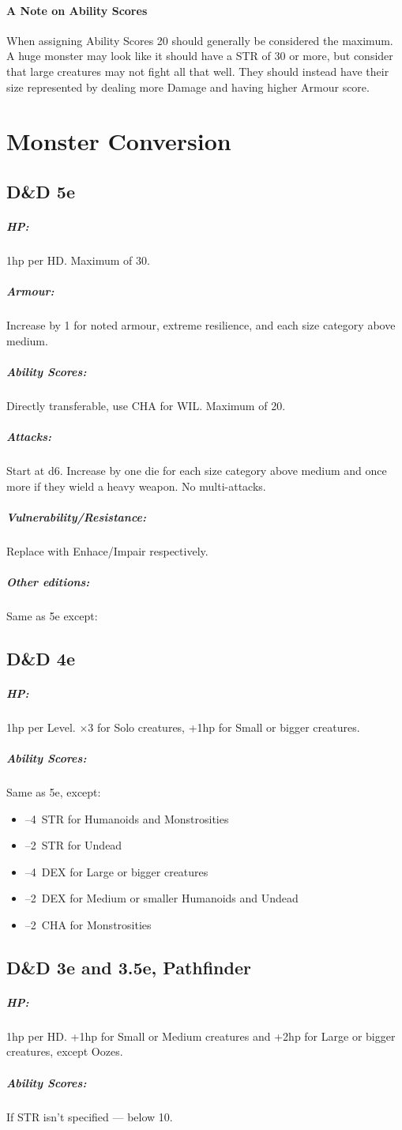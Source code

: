 \documentclass[itdr]{subfiles}
\begin{document}
\paragraph{A Note on Ability Scores}
When assigning Ability Scores 20 should generally be considered the maximum. A huge monster may look like it should have a STR of 30 or more, but consider that large creatures may not fight all that well. They should instead have their size represented by dealing more Damage and having higher Armour score.

\vfill
\break

\section{Monster Conversion}

\subsection*{D\&D 5e}

\subparagraph{HP:} 1hp per HD. Maximum of 30.
\subparagraph{Armour:} Increase by 1 for noted armour, extreme resilience, and each size category above medium.
\subparagraph{Ability Scores:} Directly transferable, use CHA for WIL. Maximum of 20.
\subparagraph{Attacks:} Start at d6. Increase by one die for each size category above medium and once more if they wield a heavy weapon. No multi-attacks.
\subparagraph{Vulnerability/Resistance:} Replace with Enhace/Impair respectively.

\subparagraph{Other editions:} Same as 5e except:
\subsection*{D\&D 4e}
\subparagraph{HP:} 1hp per Level. $\times$3 for Solo creatures, +1hp for Small or bigger creatures.
\subparagraph{Ability Scores:} Same as 5e, except:
\begin{itemize}
	\item --4~STR for Humanoids and Monstrosities
	\item --2~STR for Undead
	\item --4~DEX for Large or bigger creatures
	\item --2~DEX for Medium or smaller Humanoids and Undead
	\item --2~CHA for Monstrosities
\end{itemize}

\subsection*{D\&D 3e and 3.5e, Pathfinder}
\subparagraph{HP:} 1hp per HD. +1hp for Small or Medium creatures and +2hp for Large or bigger creatures, except Oozes.
\subparagraph{Ability Scores:} If STR isn't specified --- below 10.
\end{document}
